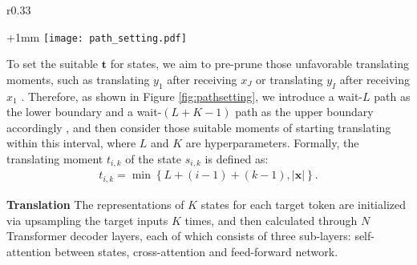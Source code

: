\documentclass{article} %
\begin{document}
\setlength{\columnsep}{11pt}
\begin{wrapfigure}{r}{0.33\textwidth}
\begin{center}
\advance\leftskip+1mm
  \vspace{-0.2in} 
 \texttt{[image: path\_setting.pdf]}
   \vspace{-0.05in} 
  \caption{Setting of translating moment $\mathbf{t}$ (e.g., $L\!=\!1$, $K\!=\!4$). %
  }\label{fig:pathsetting}
\vspace{-0.1in} 
\end{center}
\end{wrapfigure} 
To set the suitable $\mathbf{t}$ for states, we aim to pre-prune those unfavorable translating moments, such as translating $y_{1}$ after receiving $x_{J}$ or translating $y_{I}$ after receiving $x_{1}$ \citep{laf,dualpath}. Therefore, as shown in Figure \ref{fig:pathsetting}, we introduce a wait-$L$ path as the lower boundary and a wait-$(L\!+\!K\!-\!1)$ path as the upper boundary accordingly \citep{Zheng2019a}, and then consider those suitable moments of starting translating within this interval, where $L$ and $K$ are hyperparameters. Formally, the translating moment $t_{i,k}$ of the state $s_{i,k}$ is defined as:
\begin{gather}
    t_{i,k}=\min\left\{ L+\left ( i-1 \right )+\left ( k-1 \right ), \left| \mathbf{x}\right|\right\}. \label{eq:translating moment}
\end{gather}


\textbf{Translation} The representations of $K$ states for each target token are initialized via upsampling the target inputs $K$ times, and then calculated through $N$ Transformer decoder layers, each of which consists of three sub-layers: self-attention between states, cross-attention and feed-forward network.
\end{document}
